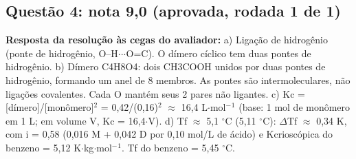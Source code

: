 \documentclass{article}%
\begin{document}
\subsection*{Questão 4: nota 9,0 (aprovada, rodada 1 de 1)}%
\textbf{Resposta da resolução às cegas do avaliador:} a) Ligação de hidrogênio (ponte de hidrogênio, O--H$\cdot$$\cdot$$\cdot$O=C). O dímero cíclico tem duas pontes de hidrogênio.\newline%
\newline%
b) Dímero C4H8O4: dois CH3COOH unidos por duas pontes de hidrogênio, formando um anel de 8 membros. As pontes são intermoleculares, não ligações covalentes. Cada O mantém seus 2 pares não ligantes.\newline%
\newline%
c) Kc = {[}dímero{]}/{[}monômero{]}$^2$ = 0,42/(0,16)$^2$ $\approx$ 16,4 L$\cdot$mol$^{-}$$^{1}$ (base: 1 mol de monômero em 1 L; em volume V, Kc = 16,4$\cdot$V).\newline%
\newline%
d) Tf $\approx$ 5,1 $^\circ$C (5,11 $^\circ$C): $\Delta$Tf $\approx$ 0,34 K, com i = 0,58 (0,016 M + 0,042 D por 0,10 mol/L de ácido) e Kcrioscópica do benzeno = 5,12 K$\cdot$kg$\cdot$mol$^{-}$$^{1}$. Tf do benzeno = 5,45 $^\circ$C.\par %
\end{document}
